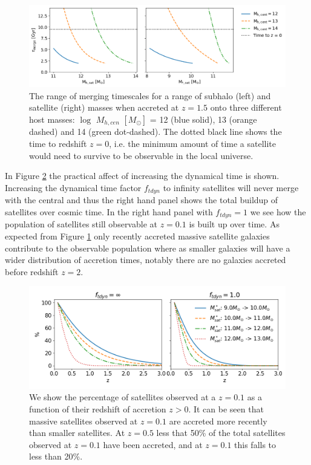 \begin{figure}[h]
	\centering
	\includegraphics[width = \linewidth]{Figures/Chapter3/Tdyn_M.png}
	\caption{The range of merging timescales for a range of subhalo (left) and satellite (right) masses when accreted at $z = 1.5$ onto three different host masses: $\log$ $M_{h, cen}$ $[M_{\odot}]$ = 12 (blue solid), 13 (orange dashed) and 14 (green dot-dashed). The dotted black line shows the time to redshift $z = 0$, i.e. the minimum amount of time a satellite would need to survive to be observable in the local universe.}
	\label{fig:Tdyn_M}
\end{figure}

In Figure \ref{fig:AccretionTime} the practical affect of increasing the dynamical time is shown. Increasing the dynamical time factor $f_{tdyn}$ to infinity satellites will never merge with the central and thus the right hand panel shows the total buildup of satellites over cosmic time. In the right hand panel with $f_{tdyn} = 1$ we see how the population of satellites still observable at $z=0.1$ is built up over time. As expected from Figure \ref{fig:Tdyn_M} only recently accreted massive satellite galaxies contribute to the observable population where as smaller galaxies will have a wider distribution of accretion times, notably there are no galaxies accreted before redshift $z=2$.

\begin{figure}[h]
	\centering
	\includegraphics[width = \linewidth]{Figures/Chapter3/AccretedSatellitePercentage.png}
	\caption{We show the percentage of satellites observed at a $z = 0.1$ as a function of their redshift of accretion $z > 0$. It can be seen that massive satellites observed at $z = 0.1$ are accreted more recently than smaller satellites. At $z = 0.5$ less that 50\% of the total satellites observed at $z = 0.1$ have been accreted, and at $z = 0.1$ this falls to less than 20\%. }
	\label{fig:AccretionTime}
\end{figure}

